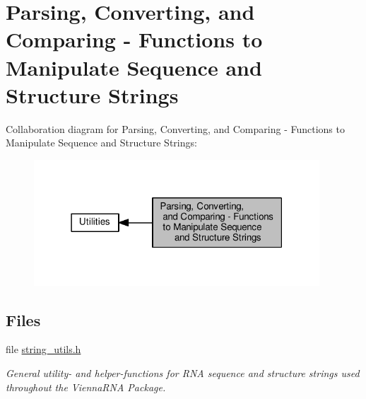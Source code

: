 \hypertarget{group__string__utils}{}\section{Parsing, Converting, and Comparing -\/ Functions to Manipulate Sequence and Structure Strings}
\label{group__string__utils}
Collaboration diagram for Parsing, Converting, and Comparing -\/ Functions to Manipulate Sequence and Structure Strings\+:
\nopagebreak
\begin{figure}[H]
\begin{center}
\leavevmode
\includegraphics[width=303pt]{group__string__utils}
\end{center}
\end{figure}
\subsection*{Files}
\begin{DoxyCompactItemize}
\item 
file \hyperlink{string__utils_8h}{string\+\_\+utils.\+h}
\begin{DoxyCompactList}\small\item\em General utility-\/ and helper-\/functions for R\+NA sequence and structure strings used throughout the Vienna\+R\+NA Package. \end{DoxyCompactList}\end{DoxyCompactItemize}
